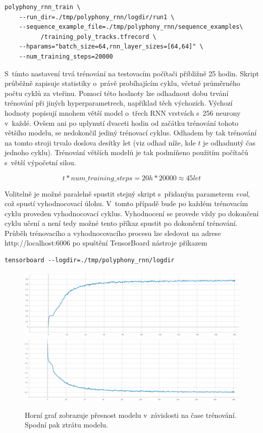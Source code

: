 \begin{verbatim}
polyphony_rnn_train \
    --run_dir=./tmp/polyphony_rnn/logdir/run1 \
    --sequence_example_file=./tmp/polyphony_rnn/sequence_examples\
          /training_poly_tracks.tfrecord \
    --hparams="batch_size=64,rnn_layer_sizes=[64,64]" \
    --num_training_steps=20000
\end{verbatim}
S~tímto nastavení trvá trénování na testovacím počítači přibližně 25 hodin.
Skript průběžně zapisuje statistiky o~právě probíhajícím cyklu, 
včetně průměrného počtu cyklů za vteřinu.
Pomocí této hodnoty lze odhadnout dobu trvání trénování při jiných hyperparametrech,
například těch výchozích.
Výchozí hodnoty popisují mnohem větší model o~třech RNN vrstvách s~256 neurony v~každé.
Ovšem ani po uplynutí dvaceti hodin od začátku trénování tohoto většího modelu,
se nedokončil jediný trénovací cyklus.
Odhadem by tak trénování na tomto stroji trvalo doslova desítky let
(viz odhad níže, kde $t$ je odhadnutý čas jednoho cyklu).
Trénování větších modelů je tak podmíňeno použitím počítačů s~větší výpočetní silou.

$$t * num\_training\_steps = 20h * 20 000 \approx 45let $$

Volitelně je možné paralelně spustit stejný skript s~přidaným parametrem \emph{eval},
což spustí vyhodnocovací úlohu.
V~tomto případě bude po každém trénovacím cyklu proveden vyhodnocovací cyklus.
Vyhodnocení se provede vždy po dokončení cyklu učení 
a není tedy možné tento příkaz spustit po dokončení trénování.
\cite{google_git_polyphony}
Průběh trénovacího a vyhodnocovacího procesu lze sledovat na adrese
http://localhost:6006 po spuštění TensorBoard nástroje příkazem

\begin{verbatim}
tensorboard --logdir=./tmp/polyphony_rnn/logdir   
\end{verbatim}
\par

\begin{figure}[h]\centering
    \centering
    \includegraphics[width=1\linewidth]{obrazky/AccuracyEpoch.png}\\[1pt]  
    \includegraphics[width=1\linewidth]{obrazky/LossEpoch.png}\\[1pt]  
    \caption{Horní graf zobrazuje přesnost modelu v~závislosti na čase trénování.
    Spodní pak ztrátu modelu.}    
    \label{obrazekaccuracyLossPerEpoch}
\end{figure}

